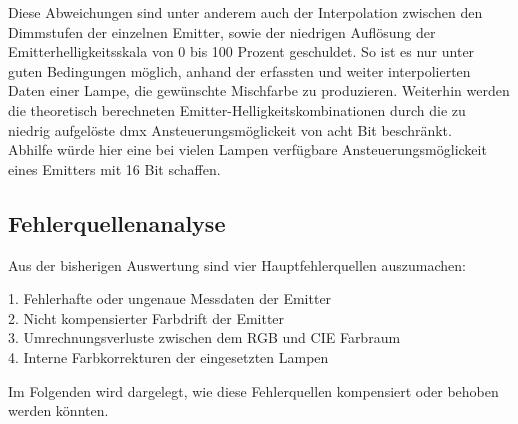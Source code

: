 \documentclass[11pt]{scrartcl}
\begin{document}
\noindent
Diese Abweichungen sind unter anderem auch der Interpolation zwischen den Dimmstufen der einzelnen Emitter, sowie der niedrigen
Auflösung der Emitterhelligkeitsskala von 0 bis 100 Prozent geschuldet. So ist es nur unter guten Bedingungen möglich,
anhand der erfassten und weiter interpolierten Daten einer Lampe, die gewünschte Mischfarbe zu produzieren. Weiterhin werden
die theoretisch berechneten Emitter-Helligkeitskombinationen durch die zu niedrig aufgelöste \ac{dmx} Ansteuerungsmöglickeit von
acht Bit beschränkt.\\
Abhilfe würde hier eine bei vielen Lampen verfügbare Ansteuerungsmöglickeit eines Emitters mit 16 Bit schaffen.
\subsection{Fehlerquellenanalyse}
Aus der bisherigen Auswertung sind vier Hauptfehlerquellen auszumachen:
\begin{addmargin}[2em]{0em}
    1. Fehlerhafte oder ungenaue Messdaten der Emitter\\
    2. Nicht kompensierter Farbdrift der Emitter\\
    3. Umrechnungsverluste zwischen dem RGB und CIE Farbraum\\
    4. Interne Farbkorrekturen der eingesetzten Lampen\\
\end{addmargin}
Im Folgenden wird dargelegt, wie diese Fehlerquellen kompensiert oder behoben werden könnten.
\end{document}
